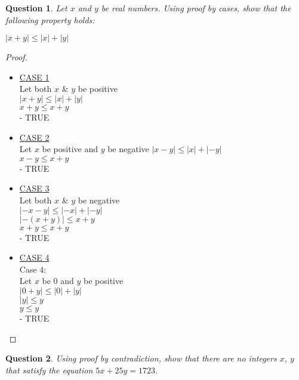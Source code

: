 \documentclass[11pt,oneside]{article}
\newtheorem{question}{Question}
\begin{document}
\begin{question}
    Let $x$ and $y$ be real numbers. Using proof by cases, show that the following property holds: \\
    \centerline{$|x + y| \leq |x| + |y|$}
\end{question}
\begin{proof}
    \begin{itemize}
        \item \underline{CASE 1} \\
            Let both $x$ \& $y$ be positive \\
            $|x + y| \leq |x| + |y|$ \\
            $x + y \leq x + y$ \\
            - TRUE
        \item \underline{CASE 2}  \\
            Let $x$ be positive and $y$ be negative
            $|x - y| \leq |x| + |-y|$ \\
            $ x - y \leq x + y$ \\
            - TRUE
        \item \underline{CASE 3}  \\
            Let both $x$ \& $y$ be negative \\
            $|-x - y| \leq |-x| + |-y|$ \\
            $|-(x + y)| \leq x + y$ \\
            $x + y \leq x + y$ \\
            - TRUE
        \item \underline{CASE 4} \\
            Case 4: \\
            Let $x$ be 0 and $y$ be positive \\
            $|0 + y| \leq |0| + |y|$ \\
            $|y| \leq y$ \\
            $y \leq y$ \\
            - TRUE
    \end{itemize}
\end{proof}

\bigskip

\begin{question}
    Using proof by contradiction, show that there are no integers $x$, $y$ that satisfy the equation $5x + 25y = 1723$.
\end{question}
\end{document}
